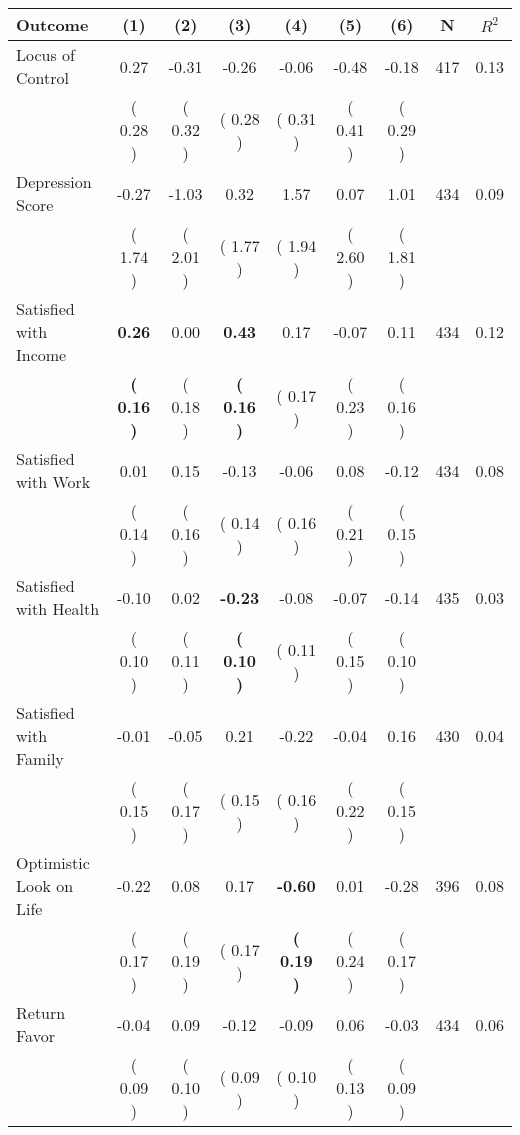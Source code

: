 \begin{tabular}{lcccccccc}
\toprule
 \textbf{Outcome} & \textbf{(1)} & \textbf{(2)} & \textbf{(3)} & \textbf{(4)} & \textbf{(5)} & \textbf{(6)} & \textbf{N} & \textbf{$ R^2$} \\
\midrule
Locus of Control &      0.27 &     -0.31 &     -0.26 &     -0.06 &     -0.48 &     -0.18 & 417 &       0.13 \\ 
 & (     0.28 ) & (     0.32 ) & (     0.28 ) & (     0.31 ) & (     0.41 ) & (     0.29 ) & \\
Depression Score &     -0.27 &     -1.03 &      0.32 &      1.57 &      0.07 &      1.01 & 434 &       0.09 \\ 
 & (     1.74 ) & (     2.01 ) & (     1.77 ) & (     1.94 ) & (     2.60 ) & (     1.81 ) & \\
Satisfied with Income & \textbf{     0.26} &      0.00 & \textbf{     0.43} &      0.17 &     -0.07 &      0.11 & 434 &       0.12 \\ 
 & \textbf{(     0.16 )} & (     0.18 ) & \textbf{(     0.16 )} & (     0.17 ) & (     0.23 ) & (     0.16 ) & \\
Satisfied with Work &      0.01 &      0.15 &     -0.13 &     -0.06 &      0.08 &     -0.12 & 434 &       0.08 \\ 
 & (     0.14 ) & (     0.16 ) & (     0.14 ) & (     0.16 ) & (     0.21 ) & (     0.15 ) & \\
Satisfied with Health &     -0.10 &      0.02 & \textbf{    -0.23} &     -0.08 &     -0.07 &     -0.14 & 435 &       0.03 \\ 
 & (     0.10 ) & (     0.11 ) & \textbf{(     0.10 )} & (     0.11 ) & (     0.15 ) & (     0.10 ) & \\
Satisfied with Family &     -0.01 &     -0.05 &      0.21 &     -0.22 &     -0.04 &      0.16 & 430 &       0.04 \\ 
 & (     0.15 ) & (     0.17 ) & (     0.15 ) & (     0.16 ) & (     0.22 ) & (     0.15 ) & \\
Optimistic Look on Life &     -0.22 &      0.08 &      0.17 & \textbf{    -0.60} &      0.01 &     -0.28 & 396 &       0.08 \\ 
 & (     0.17 ) & (     0.19 ) & (     0.17 ) & \textbf{(     0.19 )} & (     0.24 ) & (     0.17 ) & \\
Return Favor &     -0.04 &      0.09 &     -0.12 &     -0.09 &      0.06 &     -0.03 & 434 &       0.06 \\ 
 & (     0.09 ) & (     0.10 ) & (     0.09 ) & (     0.10 ) & (     0.13 ) & (     0.09 ) & \\

\end{tabular}
